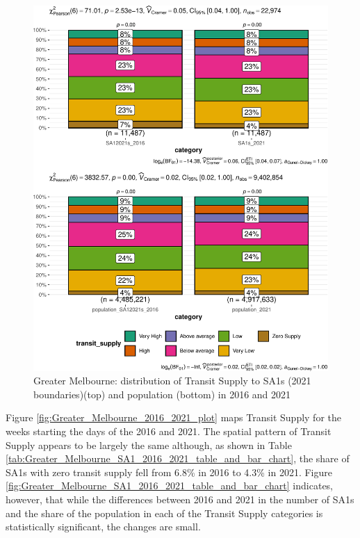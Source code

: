 \documentclass[preprint, 3p,
authoryear]{elsarticle} %
\begin{document}
\begin{figure}
\centering
\includegraphics{Leveraging_GTFS_to_assess_transit_supply_Transport_Geography_files/figure-latex/Greater_Melbourne_SA1_2016_2021_table_and_bar_chart-1.pdf}
\caption{Greater Melbourne: distribution of Transit Supply to SA1s (2021
boundaries)(top) and population (bottom) in 2016 and 2021}
\end{figure}

Figure \ref{fig:Greater_Melbourne_2016_2021_plot} maps Transit Supply
for the weeks starting the days of the 2016 and 2021. The spatial
pattern of Transit Supply appears to be largely the same although, as
shown in Table
\ref{tab:Greater_Melbourne_SA1_2016_2021_table_and_bar_chart}, the share
of SA1s with zero transit supply fell from 6.8\% in 2016 to 4.3\% in
2021. Figure
\ref{fig:Greater_Melbourne_SA1_2016_2021_table_and_bar_chart} indicates,
however, that while the differences between 2016 and 2021 in the number
of SA1s and the share of the population in each of the Transit Supply
categories is statistically significant, the changes are small.
\end{document}
